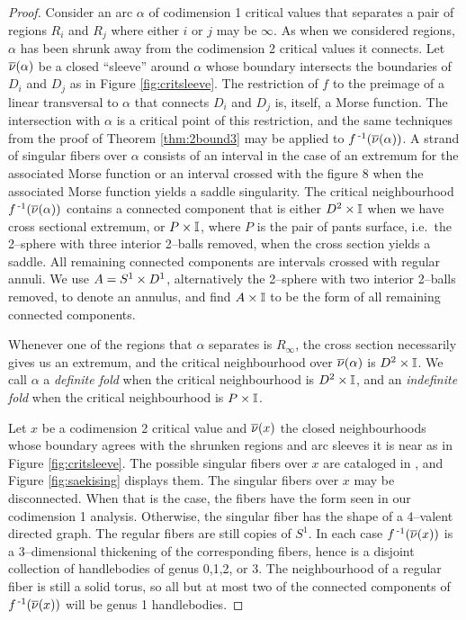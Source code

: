 \begin{proof}
	
	Consider an arc $\alpha$ of codimension 1 critical values that separates a pair of regions $R_i$ and $R_j$ where either $i$ or $j$ may be $\infty$.
	As when we considered regions, $\alpha$ has been shrunk away from the codimension 2 critical values it connects.
	Let $\overline{\nu}(\alpha)$ be a closed ``sleeve'' around $\alpha$ whose boundary intersects the boundaries of $D_i$ and $D_j$ as in Figure \ref{fig:critsleeve}.
	The restriction of $f$ to the preimage of a linear transversal to $\alpha$ that connects $D_i$ and $D_j$ is, itself, a Morse function.
	The intersection with $\alpha$ is a critical point of this restriction, and the same techniques from the proof of Theorem \ref{thm:2bound3} may be applied to $f^{\,\text{-}1}(\overline{\nu}(\alpha))$.
	A strand of singular fibers over $\alpha$ consists of an interval in the case of an extremum for the associated Morse function or an interval crossed with the figure 8 when the associated Morse function yields a saddle singularity.
	The critical neighbourhood $f^{\,\text{-}1}(\overline{\nu}(\alpha))$ contains a connected component that is either $D^2\times\mathbb{I}$ when we have cross sectional extremum, or $P\times\mathbb{I}$, where $P$ is the pair of pants surface, i.e.\ the 2--sphere with three interior 2--balls removed, when the cross section yields a saddle.
	All remaining connected components are intervals crossed with regular annuli.
	We use $A=S^1\times D^1$, alternatively the 2--sphere with two interior 2--balls removed, to denote an annulus, and find $A\times\mathbb{I}$ to be the form of all remaining connected components.
	
	Whenever one of the regions that $\alpha$ separates is $R_\infty$, the cross section necessarily gives us an extremum, and the critical neighbourhood over $\overline{\nu}(\alpha)$ is $D^2\times\mathbb{I}$.
	We call $\alpha$ a \emph{definite fold} when the critical neighbourhood is $D^2\times\mathbb{I}$, and an \emph{indefinite fold} when the critical neighbourhood is $P\times\mathbb{I}$.
	
	Let $x$ be a codimension 2 critical value and $\overline{\nu}(x)$ the closed neighbourhoods whose boundary agrees with the shrunken regions and arc sleeves it is near as in Figure \ref{fig:critsleeve}.
	The possible singular fibers over $x$ are cataloged in \cite{Saeki}, and Figure \ref{fig:saekising} displays them.
	The singular fibers over $x$ may be disconnected.
	When that is the case, the fibers have the form seen in our codimension 1 analysis.
	Otherwise, the singular fiber has the shape of a 4--valent directed graph.
	The regular fibers are still copies of $S^1$.
	In each case $f^{\,\text{-}1}(\overline{\nu}(x))$ is a 3--dimensional thickening of the corresponding fibers, hence is a disjoint collection of handlebodies of genus 0,1,2, or 3.
	The neighbourhood of a regular fiber is still a solid torus, so all but at most two of the connected components of $f^{\,\text{-}1}(\overline{\nu}(x))$ will be genus 1 handlebodies.
	

\end{proof}
